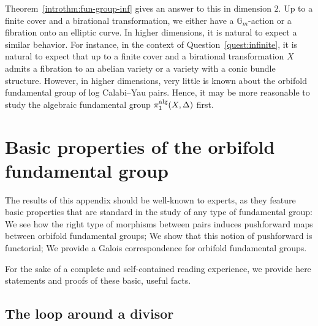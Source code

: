 \documentclass{amsart}
\theoremstyle{definition}
\theoremstyle{remark}
\numberwithin{equation}{section}
\begin{document}
Theorem~\ref{introthm:fun-group-inf} gives an answer to this in dimension $2$. Up to a finite cover and a birational transformation, we either have a $\mathbb{G}_m$-action or a fibration onto an elliptic curve.
In higher dimensions, it is natural to expect a similar behavior. 
For instance, in the context of Question~\ref{quest:infinite}, it is natural to expect that up to a finite cover and a birational transformation
$X$ admits a fibration to an abelian variety or a variety with a conic bundle structure.
However, in higher dimensions, very little is known about the orbifold fundamental group of log Calabi--Yau pairs.
Hence, it may be more reasonable to study the algebraic fundamental group $\pi_1^{\rm alg}(X,\Delta)$ first.








\newpage

\appendix

\section{Basic properties of the orbifold fundamental group}\label{appA}

The results of this appendix should be well-known to experts, as they feature basic properties that are standard in the study of any type of fundamental group: We see how the right type of morphisms between pairs induces pushforward maps between orbifold fundamental groups; We show that this notion of pushforward is functorial; We provide a Galois correspondence for orbifold fundamental groups. 

For the sake of a complete and self-contained reading experience, we provide here statements and proofs of these basic, useful facts.

\subsection{The loop around a divisor}
\end{document}
